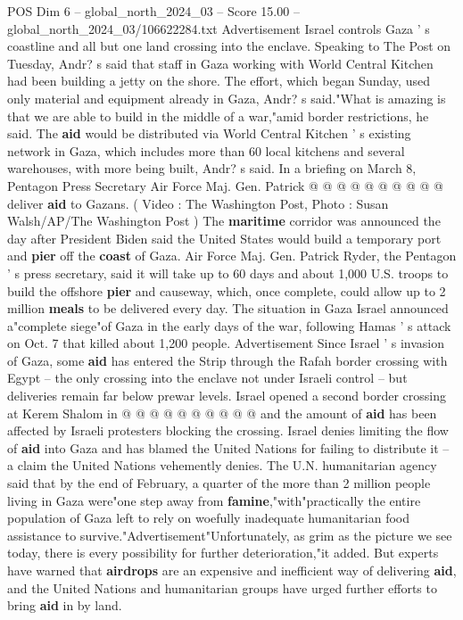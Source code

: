 \begin{textsample}{POS Dim 6 – global\_north\_2024\_03 – Score 15.00 – global\_north\_2024\_03/106622284.txt}
Advertisement Israel controls Gaza ' s coastline and all but one land crossing into the enclave.
Speaking to The Post on Tuesday, Andr? s said that staff in Gaza working with World Central Kitchen had been building a jetty on the shore.
The effort, which began Sunday, used only material and equipment already in Gaza, Andr? s said."What is amazing is that we are able to build in the middle of a war,"amid border restrictions, he said.
The \textbf{aid} would be distributed via World Central Kitchen ' s existing network in Gaza, which includes more than 60 local kitchens and several warehouses, with more being built, Andr? s said.
In a briefing on March 8, Pentagon Press Secretary Air Force Maj.
Gen.
Patrick @ @ @ @ @ @ @ @ @ @ deliver \textbf{aid} to Gazans. ( Video : The Washington Post, Photo : Susan Walsh/AP/The Washington Post ) The \textbf{maritime} corridor was announced the day after President Biden said the United States would build a temporary port and \textbf{pier} off the \textbf{coast} of Gaza.
Air Force Maj.
Gen.
Patrick Ryder, the Pentagon ' s press secretary, said it will take up to 60 days and about 1,000 U.S. troops to build the offshore \textbf{pier} and causeway, which, once complete, could allow up to 2 million \textbf{meals} to be delivered every day.
The situation in Gaza Israel announced a"complete siege"of Gaza in the early days of the war, following Hamas ' s attack on Oct. 7 that killed about 1,200 people.
Advertisement Since Israel ' s invasion of Gaza, some \textbf{aid} has entered the Strip through the Rafah border crossing with Egypt -- the only crossing into the enclave not under Israeli control -- but deliveries remain far below prewar levels.
Israel opened a second border crossing at Kerem Shalom in @ @ @ @ @ @ @ @ @ @ and the amount of \textbf{aid} has been affected by Israeli protesters blocking the crossing.
Israel denies limiting the flow of \textbf{aid} into Gaza and has blamed the United Nations for failing to distribute it -- a claim the United Nations vehemently denies.
The U.N. humanitarian agency said that by the end of February, a quarter of the more than 2 million people living in Gaza were"one step away from \textbf{famine},"with"practically the entire population of Gaza left to rely on woefully inadequate humanitarian food assistance to survive."Advertisement"Unfortunately, as grim as the picture we see today, there is every possibility for further deterioration,"it added.
But experts have warned that \textbf{airdrops} are an expensive and inefficient way of delivering \textbf{aid}, and the United Nations and humanitarian groups have urged further efforts to bring \textbf{aid} in by land.

\end{textsample}

